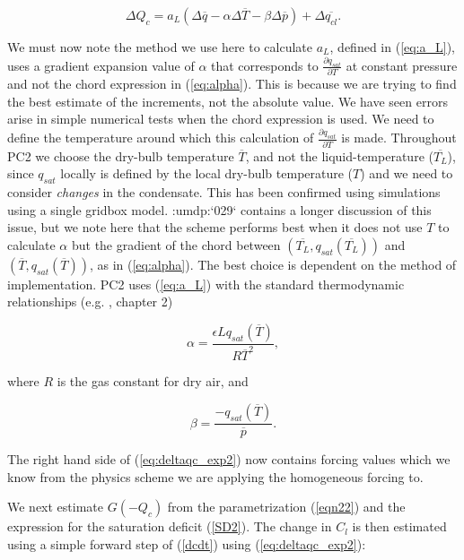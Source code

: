 \documentclass{UMDP_article}
\newcommand{\citeumdp}[1]{:umdp:`#1`}
\begin{document}
\begin{equation}
\Delta{Q_c} = a_L ( \Delta{\overline{q}} - \alpha \Delta{\overline{T}}
- \beta \Delta{\overline{p}} ) +  \Delta{\overline{q_{cl}}} .
\label{eq:deltaqc_exp2}
\end{equation}

We must now note the method we use here to calculate $a_L$, defined in
(\ref{eq:a_L}), uses a gradient expansion
value of $\alpha$ that corresponds to $\frac{\partial{q_{sat}}}
{\partial{T}}$ at
constant pressure and not the chord expression in (\ref{eq:alpha}). This
is because we are trying to find the best estimate of the increments, not
the absolute value. We have seen errors arise in simple numerical
tests when the chord expression is used.
We need to define the
temperature around which this calculation of
$\frac{\partial{q_{sat}}}{\partial{T}}$
is made.  Throughout PC2 we choose the dry-bulb temperature $\overline{T}$, and not the
liquid-temperature ($\overline{T_L}$), since $q_{sat}$ locally is
defined by the local dry-bulb temperature ($T$) and we need to consider
\textit{changes} in the condensate. This has been confirmed using
simulations using a single gridbox model. \citeumdp{029} contains
a longer discussion of this issue, but we note here that the \cite{smith90} scheme
performs best when it does not use $T$ to calculate $\alpha$
but the gradient of the chord between $(\overline{T_L}, q_{sat}(\overline{T_L}))$ and
$(\overline{T}, q_{sat}(\overline{T}))$, as in (\ref{eq:alpha}). The best choice is
dependent on the method of implementation.
PC2 uses (\ref{eq:a_L}) with the standard
thermodynamic relationships (e.g. \cite{ry89}, chapter 2)

\begin{equation}
\alpha = \frac{ \epsilon L q_{sat}(\overline{T}) } { R \overline{T}^2} ,
\label{eq:alpha_exp}
\end{equation}

where $R$ is the gas constant for dry air, and

\begin{equation}
\beta = \frac{-q_{sat}(\overline{T})}{\overline{p}} .
\label{eq:beta}
\end{equation}

The right hand side of (\ref{eq:deltaqc_exp2}) now contains forcing
values which we
know from the physics scheme we are applying the homogeneous forcing to.

We next estimate $G(-Q_c)$ from the parametrization (\ref{eqn22}) and the
expression for the saturation deficit (\ref{SD2}). The change in $C_l$ is then
estimated using a simple forward step of (\ref{dcdt}) using
(\ref{eq:deltaqc_exp2}):
\end{document}
